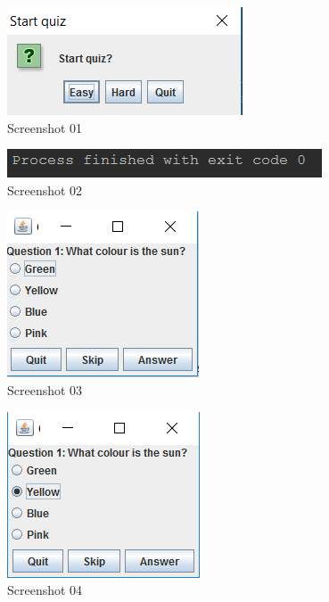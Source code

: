 \documentclass{report}
\begin{document}
    \begin{figure}[H]
        \centering
        \includegraphics{Screenshot01}
        \caption{Screenshot 01}
        \label{fig:screenshot01}
    \end{figure}
    
    \begin{figure}
        \centering
        \includegraphics{Screenshot02}
        \caption{Screenshot 02}
        \label{fig:screenshot02}
    \end{figure}
    
    \begin{figure}
        \centering
        \includegraphics{Screenshot03}
        \caption{Screenshot 03}
        \label{fig:screenshot03}
    \end{figure}
    
    \begin{figure}
        \centering
        \includegraphics{Screenshot04}
        \caption{Screenshot 04}
        \label{fig:screenshot04}
    \end{figure}
\end{document}
